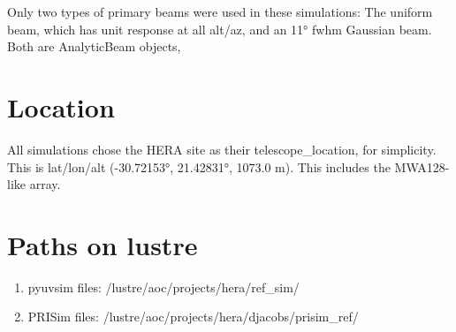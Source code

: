 \documentclass{article}
\begin{document}
Only two types of primary beams were used in these simulations: The uniform beam, which has unit response at all alt/az, and an 11° fwhm Gaussian beam. Both are AnalyticBeam objects,

 
\section*{Location}

All simulations chose the HERA site as their telescope\_location, for simplicity. This is lat/lon/alt (-30.72153°, 21.42831°, 1073.0 m). This includes the MWA128-like array.

 
\section*{Paths on lustre}

\begin{enumerate}
\item[] pyuvsim files: /lustre/aoc/projects/hera/ref\_sim/
\item[] PRISim files:  /lustre/aoc/projects/hera/djacobs/prisim\_ref/
\end{enumerate}
\end{document}

